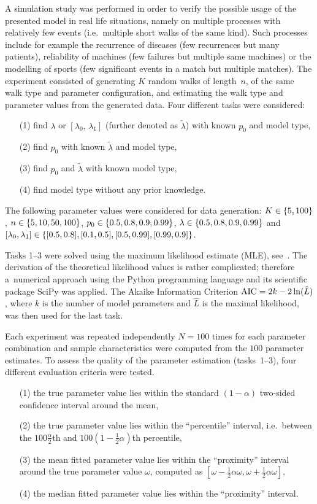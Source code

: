 A simulation study was performed in order to verify the possible usage of the
presented model in real life situations, namely on multiple processes
with relatively few events
(i.e.~multiple short walks of the same kind).
Such processes include for example the recurrence of diseases (few recurrences
but many patients), reliability of machines (few failures but multiple same machines)
or the modelling of sports (few significant events in a match but multiple matches).
The experiment consisted of generating $K$ random walks of length~$n$,\vadjust{\goodbreak}
of the same walk type and parameter configuration, and estimating the walk type and parameter values from the generated data.
Four different tasks were considered:
\begin{itemize}
\item[(1)] find $\lambda$ or $[\lambda_{0},\,\lambda_{1}]$ (further denoted as $\tilde{\lambda}$) with known $p_{0}$ and model type,
\item[(2)] find $p_{0}$ with known $\tilde{\lambda}$ and model type,
\item[(3)] find $p_{0}$ and $\tilde{\lambda}$ with known model type,
\item[(4)] find model type without any prior knowledge.
\end{itemize}
\bgroup\let\,\relax
The following parameter values were considered for data generation: $K\in\{5,\,100\}$, $n\in\{5,\,10,\,50,\,100\}$, $p_{0}\in\{0.5,\,0.8,\,0.9,\,0.99\}$, $\lambda\in\{0.5,\,0.8,\,0.9,\,0.99\}$ and $[\lambda_{0},\,\lambda_{1}]\in\{[0.5,\,0.8],\,[0.1,\,0.5],\,[0.5,\,0.99],\,[0.99,\,0.9]\}$.\egroup


Tasks 1--3 were solved using the maximum likelihood estimate (MLE), see~\cite{rossi2018mathematical}.
The derivation of the theoretical likelihood values is rather complicated; therefore a~numerical approach using the Python programming language and its scientific package SciPy was applied.
The Akaike Information Criterion ${\rm AIC}=2k-2\ln(\hat{L})$, where $k$ is the number of model parameters and $\hat{L}$ is the maximal likelihood, was then used for the last task.

Each experiment was repeated independently $N=100$ times for each parameter combination and sample characteristics were computed from the $100$ parameter estimates.
To assess the quality of the parameter estimation (tasks~1--3), four different evaluation criteria were tested.
\begin{itemize}
\item[(1)] the true parameter value lies within the standard $(1-\alpha)$ two-sided confidence interval around the mean,
\item[(2)] the true parameter value lies within the ``percentile'' interval, i.e.~between the $100\frac{{\alpha}}{2}$th and $100(1-\frac{1}{2}\alpha)$th percentile,
\item[(3)] the mean fitted parameter value lies within the ``proximity'' interval around the true parameter value $\omega$, computed as $[\omega-\frac{1}{2}\alpha\omega,\omega+\frac{1}{2}\alpha\omega]$,
\item[(4)] the median fitted parameter value lies within the ``proximity'' interval.
\end{itemize}

